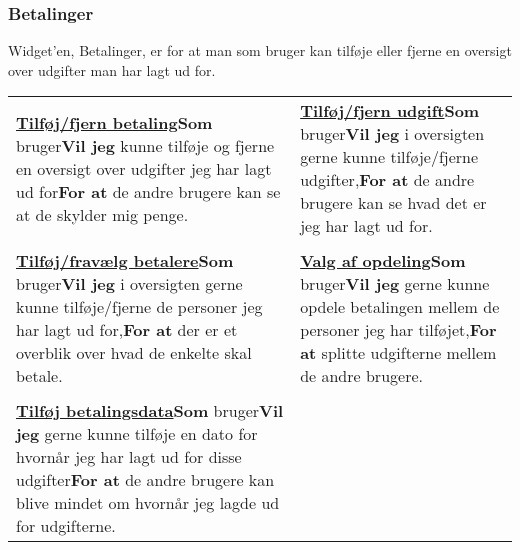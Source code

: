 \subsubsection{Betalinger}
Widget'en, Betalinger, er for at man som bruger kan tilføje eller fjerne en oversigt over udgifter man har lagt ud for.\newline

\begin{tabular}{p{2.5in}p{2.5in}}
\textbf{\underline{Tilføj/fjern betaling}}\newline \textbf{Som} bruger\newline \textbf{Vil jeg} kunne tilføje og fjerne en oversigt over udgifter jeg har lagt ud for\newline \textbf{For at} de andre brugere kan se at de skylder mig penge. & 

\textbf{\underline{Tilføj/fjern udgift}}\newline \textbf{Som} bruger\newline \textbf{Vil jeg} i oversigten gerne kunne tilføje/fjerne udgifter,\newline \textbf{For at} de andre brugere kan se hvad det er jeg har lagt ud for.  \\\\

\textbf{\underline{Tilføj/fravælg betalere}}\newline \textbf{Som} bruger\newline \textbf{Vil jeg} i oversigten gerne kunne tilføje/fjerne de personer jeg har lagt ud for,\newline \textbf{For at} der er et overblik over hvad de enkelte skal betale.  & 

\textbf{\underline{Valg af opdeling}}\newline \textbf{Som} bruger\newline \textbf{Vil jeg} gerne kunne opdele betalingen mellem de personer jeg har tilføjet,\newline \textbf{For at} splitte udgifterne mellem de andre brugere.  \\\\  

\textbf{\underline{Tilføj betalingsdata}}\newline \textbf{Som} bruger\newline \textbf{Vil jeg} gerne kunne tilføje en dato for hvornår jeg har lagt ud for disse udgifter\newline \textbf{For at} de andre brugere kan blive mindet om hvornår jeg lagde ud for udgifterne.  &


\end{tabular}
